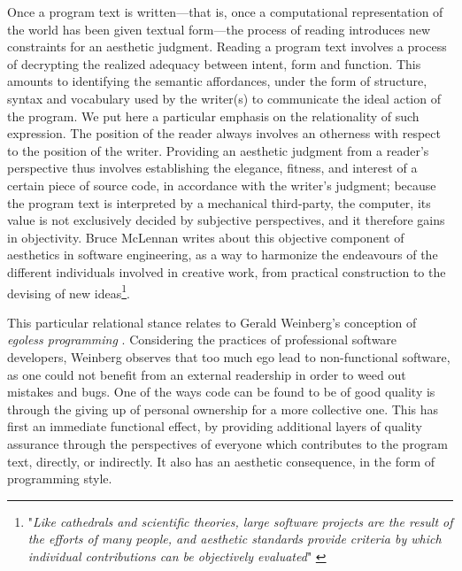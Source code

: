 Once a program text is written—that is, once a computational representation of the world has been given textual form—the process of reading introduces new constraints for an aesthetic judgment. Reading a program text involves a process of decrypting the realized adequacy between intent, form and function. This amounts to identifying the semantic affordances, under the form of structure, syntax and vocabulary used by the writer(s) to communicate the ideal action of the program. We put here a particular emphasis on the relationality of such expression. The position of the reader always involves an otherness with respect to the position of the writer. Providing an aesthetic judgment from a reader's perspective thus involves establishing the elegance, fitness, and interest of a certain piece of source code, in accordance with the writer's judgment; because the program text is interpreted by a mechanical third-party, the computer, its value is not exclusively decided by subjective perspectives, and it therefore gains in objectivity. Bruce McLennan writes about this objective component of aesthetics in software engineering, as a way to harmonize the endeavours of the different individuals involved in creative work, from practical construction to the devising of new ideas\footnote{"\emph{Like cathedrals and scientific theories, large software projects are the result of the efforts of many people, and aesthetic standards provide criteria by which individual contributions can be objectively evaluated}" \citep{schummer_aesthetic_2009}}.

This particular relational stance relates to Gerald Weinberg's conception of \emph{egoless programming} \citep{weinberg_psychology_1998}. Considering the practices of professional software developers, Weinberg observes that too much ego lead to non-functional software, as one could not benefit from an external readership in order to weed out mistakes and bugs. One of the ways code can be found to be of good quality is through the giving up of personal ownership for a more collective one. This has first an immediate functional effect, by providing additional layers of quality assurance through the perspectives of everyone which contributes to the program text, directly, or indirectly. It also has an aesthetic consequence, in the form of programming style.

